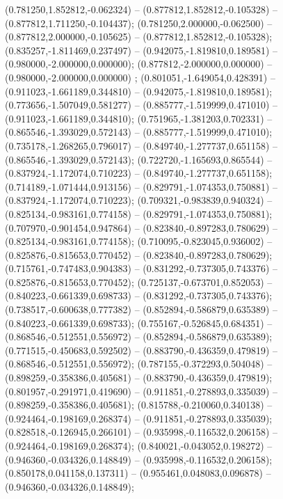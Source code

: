  (0.781250,1.852812,-0.062324) -- (0.877812,1.852812,-0.105328) -- (0.877812,1.711250,-0.104437);
 (0.781250,2.000000,-0.062500) -- (0.877812,2.000000,-0.105625) -- (0.877812,1.852812,-0.105328);
 (0.835257,-1.811469,0.237497) -- (0.942075,-1.819810,0.189581) -- (0.980000,-2.000000,0.000000);
 (0.877812,-2.000000,0.000000) -- (0.980000,-2.000000,0.000000) ;
 (0.801051,-1.649054,0.428391) -- (0.911023,-1.661189,0.344810) -- (0.942075,-1.819810,0.189581);
 (0.773656,-1.507049,0.581277) -- (0.885777,-1.519999,0.471010) -- (0.911023,-1.661189,0.344810);
 (0.751965,-1.381203,0.702331) -- (0.865546,-1.393029,0.572143) -- (0.885777,-1.519999,0.471010);
 (0.735178,-1.268265,0.796017) -- (0.849740,-1.277737,0.651158) -- (0.865546,-1.393029,0.572143);
 (0.722720,-1.165693,0.865544) -- (0.837924,-1.172074,0.710223) -- (0.849740,-1.277737,0.651158);
 (0.714189,-1.071444,0.913156) -- (0.829791,-1.074353,0.750881) -- (0.837924,-1.172074,0.710223);
 (0.709321,-0.983839,0.940324) -- (0.825134,-0.983161,0.774158) -- (0.829791,-1.074353,0.750881);
 (0.707970,-0.901454,0.947864) -- (0.823840,-0.897283,0.780629) -- (0.825134,-0.983161,0.774158);
 (0.710095,-0.823045,0.936002) -- (0.825876,-0.815653,0.770452) -- (0.823840,-0.897283,0.780629);
 (0.715761,-0.747483,0.904383) -- (0.831292,-0.737305,0.743376) -- (0.825876,-0.815653,0.770452);
 (0.725137,-0.673701,0.852053) -- (0.840223,-0.661339,0.698733) -- (0.831292,-0.737305,0.743376);
 (0.738517,-0.600638,0.777382) -- (0.852894,-0.586879,0.635389) -- (0.840223,-0.661339,0.698733);
 (0.755167,-0.526845,0.684351) -- (0.868546,-0.512551,0.556972) -- (0.852894,-0.586879,0.635389);
 (0.771515,-0.450683,0.592502) -- (0.883790,-0.436359,0.479819) -- (0.868546,-0.512551,0.556972);
 (0.787155,-0.372293,0.504048) -- (0.898259,-0.358386,0.405681) -- (0.883790,-0.436359,0.479819);
 (0.801957,-0.291971,0.419690) -- (0.911851,-0.278893,0.335039) -- (0.898259,-0.358386,0.405681);
 (0.815788,-0.210060,0.340138) -- (0.924464,-0.198169,0.268374) -- (0.911851,-0.278893,0.335039);
 (0.828518,-0.126945,0.266101) -- (0.935998,-0.116532,0.206158) -- (0.924464,-0.198169,0.268374);
 (0.840021,-0.043052,0.198272) -- (0.946360,-0.034326,0.148849) -- (0.935998,-0.116532,0.206158);
 (0.850178,0.041158,0.137311) -- (0.955461,0.048083,0.096878) -- (0.946360,-0.034326,0.148849);

